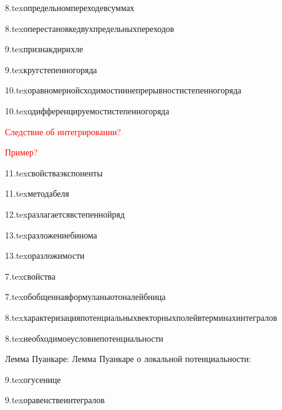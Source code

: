 {8.tex}{определьномпереходевсуммах}

{8.tex}{оперестановкедвухпредельныхпереходов}

{9.tex}{признакдирихле}

{9.tex}{кругстепенногоряда}

{10.tex}{оравномернойсходимостиинепрерывностистепенногоряда}

{10.tex}{одифференцируемостистепенногоряда}

\textcolor{red}{Следствие об интегрировании?}

\textcolor{red}{Пример?}

{11.tex}{свойстваэкспоненты}

{11.tex}{методабеля}

{12.tex}{разлагаетсявстепеннойряд}

{13.tex}{разложениебинома}

{13.tex}{оразложимости}

{7.tex}{свойства}

{7.tex}{обобщеннаяформуланьютоналейбница}

{8.tex}{характеризацияпотенциальныхвекторныхполейвтерминахинтегралов}

{8.tex}{необходимоеусловиепотенциальности}

Лемма Пуанкаре:
Лемма Пуанкаре о локальной потенциальности:

{9.tex}{огусенице}

{9.tex}{оравенствеинтегралов}

